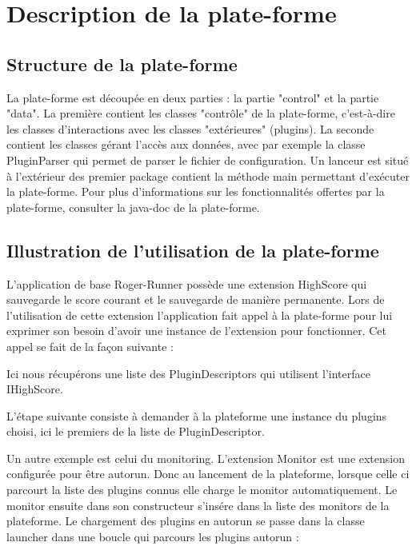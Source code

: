 \section{Description de la plate-forme}
\label{sec:desc_plateforme}

\subsection{Structure de la plate-forme}

    La plate-forme est découpée en deux parties : la partie "control" et la partie "data". La première contient les classes "contrôle" de la plate-forme, c'est-à-dire les classes d'interactions avec les classes "extérieures" (plugins). La seconde contient les classes gérant l'accès aux données, avec par exemple la classe PluginParser qui permet de parser le fichier de configuration. Un lanceur est situé à l'extérieur des premier package contient la méthode main permettant d'exécuter la plate-forme. Pour plus d'informations sur les fonctionnalités offertes par la plate-forme, consulter la java-doc de la plate-forme.

\subsection{Illustration de l'utilisation de la plate-forme}

    L'application de base Roger-Runner possède une extension HighScore qui sauvegarde le score courant et le sauvegarde de manière permanente. Lors de l'utilisation de cette extension l'application fait appel à la plate-forme pour lui exprimer son besoin d'avoir une instance de l'extension pour fonctionner. Cet appel se fait de la façon suivante :
    
    Ici nous récupérons une liste des PluginDescriptors qui utilisent l'interface IHighScore.
    
    L'étape suivante consiste à demander à la plateforme une instance du plugins choisi, ici le premiers de la liste de PluginDescriptor.
    \newline
    
    Un autre exemple est celui du monitoring. L'extension Monitor est une extension configurée pour être autorun. Donc au lancement de la plateforme, lorsque celle ci parcourt la liste des plugins connus elle charge le monitor automatiquement. Le monitor ensuite dans son constructeur s'insére dans la liste des monitors de la plateforme. Le chargement des plugins en autorun se passe dans la classe launcher dans une boucle qui parcours les plugins autorun :
    